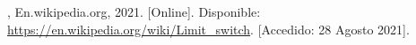 %

%

\begin{flushleft}
\begin{thebibliography}{9}

, En.wikipedia.org, 2021. [Online]. Disponible: \href{https://en.wikipedia.org/wiki/Limit\_switch}{https://en.wikipedia.org/wiki/Limit\_switch}. [Accedido: 28 Agosto 2021].

\end{thebibliography}
\end{flushleft}

%
